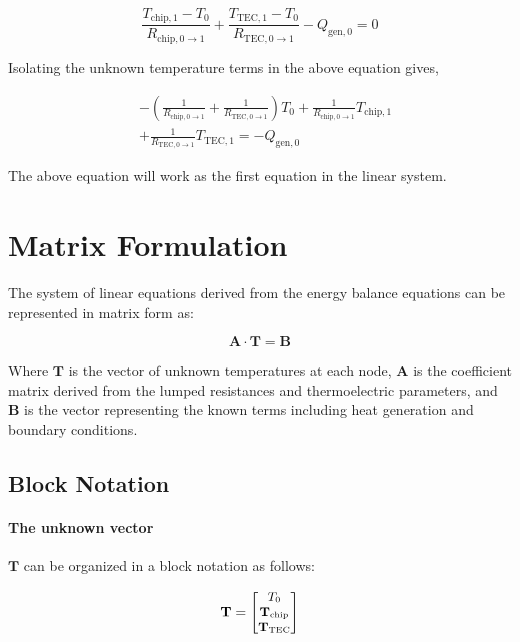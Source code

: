 \documentclass[10pt,a4paper,twocolumn]{article}
\begin{document}
\begin{equation*}
     \frac{T_{\text{chip},1} - T_{0}}{R_{\text{chip},0\to 1}} + \frac{T_{\text{TEC},1} - T_{0}}{R_{\text{TEC},0\to 1}} - Q_{\text{gen},0} = 0
\end{equation*}

Isolating the unknown temperature terms in the above equation gives,

\begin{equation}
  \begin{aligned}
     & -\left( \frac{1}{R_{\text{chip},0\to 1}} + \frac{1}{R_{\text{TEC},0\to 1}} \right) T_{0} + \frac{1}{R_{\text{chip},0\to 1}} T_{\text{chip},1}\\ &+ \frac{1}{R_{\text{TEC},0\to 1}} T_{\text{TEC},1} = - Q_{\text{gen},0}
  \end{aligned}
\end{equation}

The above equation will work as the first equation in the linear system.

\section{Matrix Formulation}

The system of linear equations derived from the energy balance equations can be represented in matrix form as:

\begin{equation}
  \mathbf{A} \cdot \mathbf{T} = \mathbf{B}
\end{equation}

Where $\mathbf{T}$ is the vector of unknown temperatures at each node, $\mathbf{A}$ is the coefficient matrix derived from the lumped resistances and thermoelectric parameters, and $\mathbf{B}$ is the vector representing the known terms including heat generation and boundary conditions.

\subsection{Block Notation}

\paragraph{The unknown vector} $\mathbf{T}$ can be organized in a block notation as follows:

\begin{equation}
  \small
  \mathbf{T} = \begin{bmatrix}
    T_{0}                   \\
    \mathbf{T_{\text{chip}}}\\
    \mathbf{T_{\text{TEC}}}
  \end{bmatrix}
\end{equation}
\end{document}
